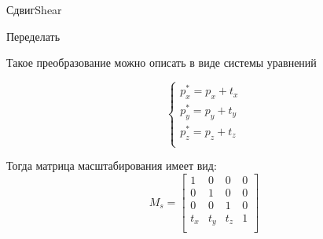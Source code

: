 \documentclass{beamer}
\begin{document}
	\begin{frame}{Сдвиг}{Shear}
		
		Переделать

		Такое преобразование можно описать в виде системы уравнений
		
		\[
			\begin{cases}
				p_x^{*} = p_x + t_x \\
				p_y^{*} = p_y + t_y \\
				p_z^{*} = p_z + t_z \\
			\end{cases}
		\]

		Тогда матрица масштабирования имеет вид:
		\[
			M_s = 
			\begin{bmatrix}
				1 & 0 & 0 & 0  \\
				0 & 1 & 0 & 0  \\
				0 & 0 & 1 & 0  \\
				t_x & t_y & t_z & 1 \\
			\end{bmatrix}
		\]
		
	\end{frame}
\fi
\end{document}
